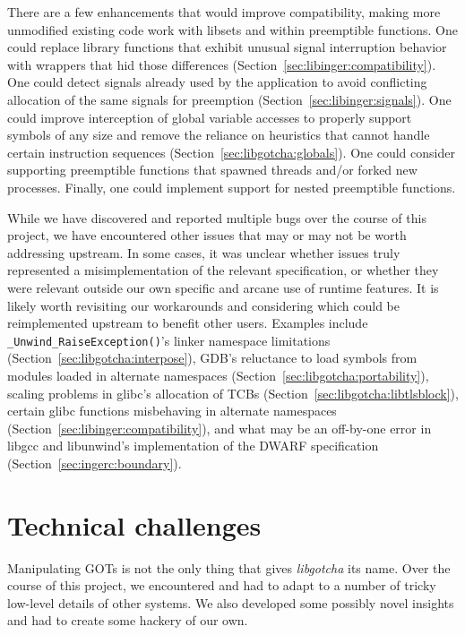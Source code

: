 There are a few enhancements that would improve compatibility, making more unmodified
existing code work with libsets and within preemptible functions.  One could replace
library functions that exhibit unusual signal interruption behavior with wrappers
that hid those differences (Section~\ref{sec:libinger:compatibility}).  One could
detect signals already used by the application to avoid conflicting allocation of the
same signals for preemption (Section~\ref{sec:libinger:signals}).  One could improve
interception of global variable accesses to properly support symbols of any size and
remove the reliance on heuristics that cannot handle certain instruction sequences
(Section~\ref{sec:libgotcha:globals}).  One could consider supporting preemptible
functions that spawned threads and/or forked new processes.  Finally, one could
implement support for nested preemptible functions.

While we have discovered and reported multiple bugs over the course of this project,
we have encountered other issues that may or may not be worth addressing upstream.
In some cases, it was unclear whether issues truly represented a misimplementation of
the relevant specification, or whether they were relevant outside our own specific
and arcane use of runtime features.  It is likely worth revisiting our workarounds
and considering which could be reimplemented upstream to benefit other users.
Examples include \texttt{\_Unwind\_RaiseException()}'s linker namespace limitations
(Section~\ref{sec:libgotcha:interpose}), GDB's reluctance to load symbols from
modules loaded in alternate namespaces (Section~\ref{sec:libgotcha:portability}),
scaling problems in glibc's allocation of TCBs
(Section~\ref{sec:libgotcha:libtlsblock}), certain glibc functions misbehaving in
alternate namespaces (Section~\ref{sec:libinger:compatibility}), and what may be an
off-by-one error in libgcc and libunwind's implementation of the DWARF specification
(Section~\ref{sec:ingerc:boundary}).


\section{Technical challenges}
\label{sec:thatsawrap:challenges}

Manipulating GOTs is not the only thing that gives \textit{libgotcha} its name.  Over
the course of this project, we encountered and had to adapt to a number of tricky
low-level details of other systems.  We also developed some possibly novel insights
and had to create some hackery of our own.

